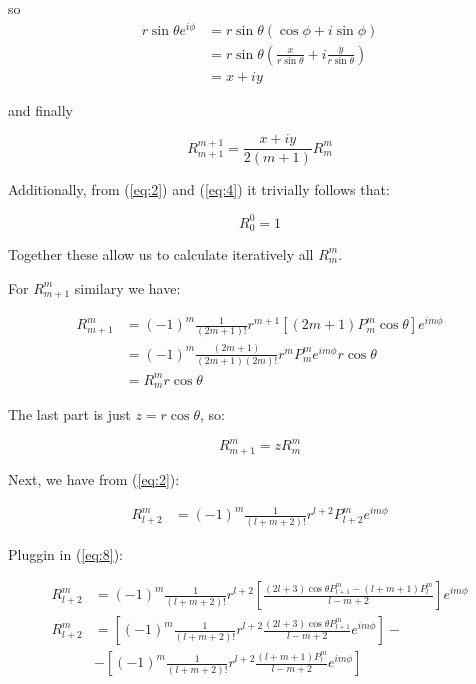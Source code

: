 \documentclass{article}
\begin{document}
so
\begin{equation}
  \begin{split}
    r \sin{\theta} e^{i\phi} & = r \sin{\theta} (\cos{\phi} + i \sin{\phi}) \\
    & = r \sin{\theta} ( \frac{x}{r\sin{\theta}} + i \frac{y}{r\sin{\theta}}) \\
    & = x+iy
  \end{split}
\end{equation}

and finally

\begin{equation} \label{eq:14}
  \boxed{R^{m+1}_{m+1} = \frac{x+iy}{2(m+1)} R^m_m}
\end{equation}

Additionally, from (\ref{eq:2}) and (\ref{eq:4}) it trivially follows that:

\begin{equation} \label{eq:15}
  \boxed{R^0_0 = 1}
\end{equation}

Together these allow us to calculate iteratively all $R^m_m$.

For $R^m_{m+1}$ similary we have:

\begin{equation}
  \begin{split}
    R^m_{m+1} & = (-1)^m \frac{1}{(2m+1)!} r^{m+1} [(2m+1) P^{m}_{m} \cos{\theta}] e^{i m \phi} \\
    & = (-1)^m \frac{(2m+1)}{(2m+1)(2m)!} r^m P^m_m e^{im\phi} r \cos{\theta} \\
    & = R^m_m r \cos{\theta}
  \end{split}
\end{equation}

The last part is just $z = r \cos{\theta}$, so:

\begin{equation} \label{eq:17}
  \boxed{R^m_{m+1} = z R^m_m}
\end{equation}

Next, we have from (\ref{eq:2}):

\begin{equation}
  \begin{split}
    R^m_{l+2} & = (-1)^m \frac{1}{(l+m+2)!} r^{l+2} P^m_{l+2} e^{i m \phi}
  \end{split}
\end{equation}

Pluggin in (\ref{eq:8}):

\begin{equation}
  \begin{split} \label{eq:19}
    R^m_{l+2} & = (-1)^m \frac{1}{(l+m+2)!} r^{l+2} \left[ \frac{(2l+3)\cos{\theta}P^m_{l+1} - (l+m+1)P^m_{l}}{l-m+2} \right] e^{i m \phi} \\
    R^m_{l+2} & = \left[ (-1)^m \frac{1}{(l+m+2)!} r^{l+2} \frac{(2l+3)\cos{\theta}P^m_{l+1}}{l-m+2} e^{i m \phi} \right] - \\
    & - \left[ (-1)^m \frac{1}{(l+m+2)!} r^{l+2} \frac{(l+m+1)P^m_l}{l-m+2} e^{i m \phi}\right]
  \end{split}
\end{equation}
\end{document}
